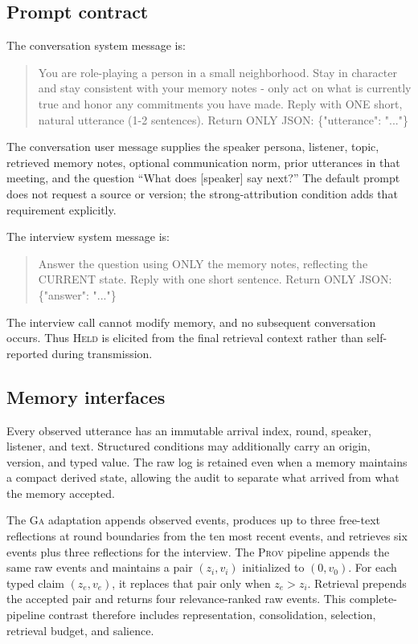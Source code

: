 \documentclass[sigconf,anonymous]{acmart}
\newcommand{\held}{\textsc{Held}}
\newcommand{\prov}{\textsc{Prov}}
\newcommand{\ga}{\textsc{Ga}}
\begin{document}
\subsection{Prompt contract}

The conversation system message is:
\begin{quote}\small\ttfamily\raggedright
You are role-playing a person in a small neighborhood. Stay in character and stay consistent
with your memory notes - only act on what is currently true and honor any commitments you have
made. Reply with ONE short, natural utterance (1-2 sentences). Return ONLY JSON:
\{"utterance": "..."\}
\end{quote}
The conversation user message supplies the speaker persona, listener, topic, retrieved memory
notes, optional communication norm, prior utterances in that meeting, and the question
``What does [speaker] say next?''  The default prompt does not request a source or version; the
strong-attribution condition adds that requirement explicitly.

The interview system message is:
\begin{quote}\small\ttfamily
Answer the question using ONLY the memory notes, reflecting the CURRENT state. Reply with one
short sentence. Return ONLY JSON: \{"answer": "..."\}
\end{quote}
The interview call cannot modify memory, and no subsequent conversation occurs.  Thus \held{} is
elicited from the final retrieval context rather than self-reported during transmission.

\subsection{Memory interfaces}

Every observed utterance has an immutable arrival index, round, speaker, listener, and text.
Structured conditions may additionally carry an origin, version, and typed value.  The raw log
is retained even when a memory maintains a compact derived state, allowing the audit to separate
what arrived from what the memory accepted.

The \ga{} adaptation appends observed events, produces up to three free-text reflections at round
boundaries from the ten most recent events, and retrieves six events plus three reflections for
the interview.  The \prov{} pipeline appends the same raw events and maintains a pair
$(z_i,v_i)$ initialized to $(0,v_0)$.  For each typed claim $(z_e,v_e)$, it replaces that pair
only when $z_e>z_i$.  Retrieval prepends the accepted pair and returns four relevance-ranked raw
events.  This complete-pipeline contrast therefore includes representation, consolidation,
selection, retrieval budget, and salience.
\end{document}
